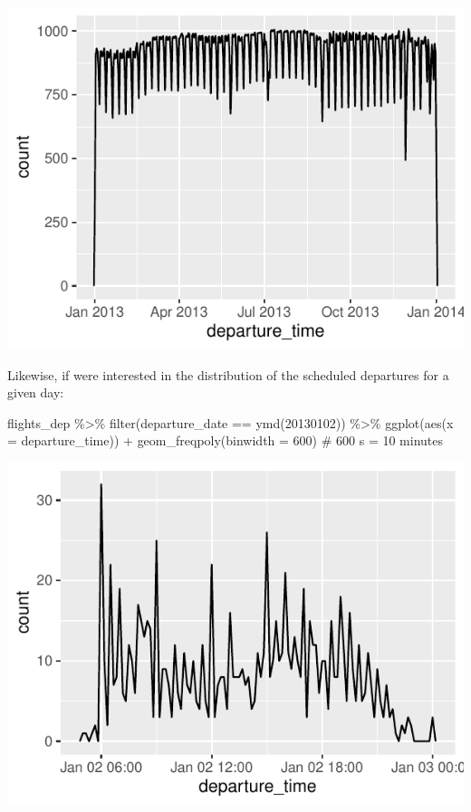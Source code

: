 \documentclass[
  letterpaper,
  DIV=11,
  numbers=noendperiod]{scrartcl}
\newenvironment{Shaded}{\begin{snugshade}}{\end{snugshade}}
\newcommand{\AttributeTok}[1]{\textcolor[rgb]{0.40,0.45,0.13}{#1}}
\newcommand{\CommentTok}[1]{\textcolor[rgb]{0.37,0.37,0.37}{#1}}
\newcommand{\DecValTok}[1]{\textcolor[rgb]{0.68,0.00,0.00}{#1}}
\newcommand{\FunctionTok}[1]{\textcolor[rgb]{0.28,0.35,0.67}{#1}}
\newcommand{\NormalTok}[1]{\textcolor[rgb]{0.00,0.23,0.31}{#1}}
\newcommand{\SpecialCharTok}[1]{\textcolor[rgb]{0.37,0.37,0.37}{#1}}
\begin{document}
\begin{center}
\includegraphics{tutorial_files/figure-pdf/unnamed-chunk-6-1.pdf}
\end{center}

Likewise, if were interested in the distribution of the scheduled
departures for a given day:

\begin{Shaded}
\begin{Highlighting}[]
\NormalTok{flights\_dep }\SpecialCharTok{\%\textgreater{}\%}
  \FunctionTok{filter}\NormalTok{(departure\_date }\SpecialCharTok{==} \FunctionTok{ymd}\NormalTok{(}\DecValTok{20130102}\NormalTok{)) }\SpecialCharTok{\%\textgreater{}\%}
  \FunctionTok{ggplot}\NormalTok{(}\FunctionTok{aes}\NormalTok{(}\AttributeTok{x =}\NormalTok{ departure\_time)) }\SpecialCharTok{+}
  \FunctionTok{geom\_freqpoly}\NormalTok{(}\AttributeTok{binwidth =} \DecValTok{600}\NormalTok{) }\CommentTok{\# 600 s = 10 minutes}
\end{Highlighting}
\end{Shaded}

\begin{center}
\includegraphics{tutorial_files/figure-pdf/unnamed-chunk-7-1.pdf}
\end{center}
\end{document}
